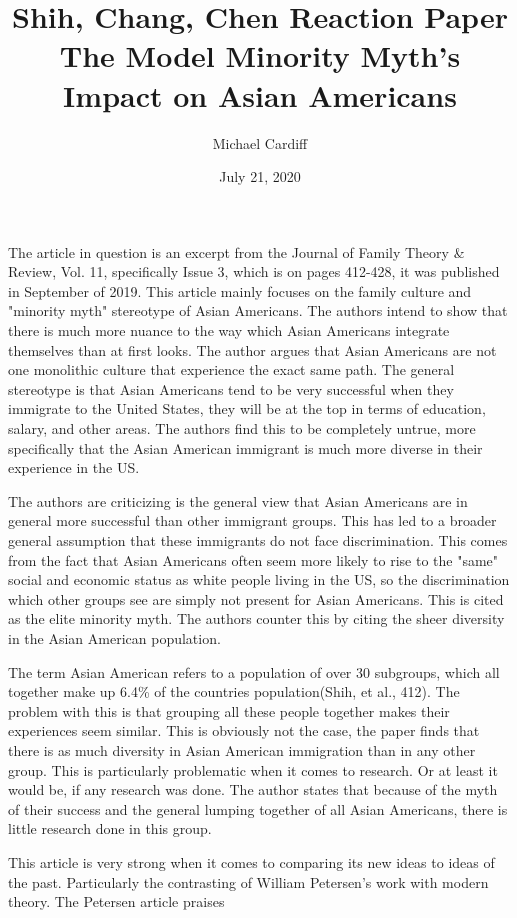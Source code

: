 \documentclass[12pt]{article}
\title{\vspace{-5em}Shih, Chang, Chen Reaction Paper \\ The Model
  Minority Myth's Impact on Asian Americans}
\author{Michael Cardiff}
\date{July 21, 2020}
\begin{document}
\maketitle
The article in question is an excerpt from the Journal of Family Theory \& Review, Vol. 11, specifically Issue 3, which is on pages 412-428, it was published in September of 2019. This article mainly focuses on the family culture and "minority myth" stereotype of Asian Americans. The authors intend to show that there is much more nuance to the way which Asian Americans integrate themselves than at first looks. The author argues that Asian Americans are not one monolithic culture that experience the exact same path. The general stereotype is that Asian Americans tend to be very successful when they immigrate to the United States, they will be at the top in terms of education, salary, and other areas. The authors find this to be completely untrue, more specifically that the Asian American immigrant is much more diverse in their experience in the US.
\par
The authors are criticizing is the general view that Asian Americans
are in general more successful than other immigrant groups. This has
led to a broader general assumption that these immigrants do not face
discrimination. This comes from the fact that Asian Americans often
seem more likely to rise to the "same" social and economic status as
white people living in the US, so the discrimination which other
groups see are simply not present for Asian Americans. This is cited
as the elite minority myth. The authors counter this by citing the
sheer diversity in the Asian American population.
\par
The term Asian American refers to a population of over 30 subgroups,
which all together make up 6.4\% of the countries population(Shih, et
al., 412). The problem with this is that grouping all these people
together makes their experiences seem similar. This is obviously not
the case, the paper finds that there is as much diversity in Asian
American immigration than in any other group. This is particularly
problematic when it comes to research. Or at least it would be, if any
research was done. The author states that because of the myth of their
success and the general lumping together of all Asian Americans, there
is little research done in this group.
\par
This article is very strong when it comes to comparing its new ideas
to ideas of the past. Particularly the contrasting of William
Petersen's work with modern theory. The Petersen article praises
\end{document}

